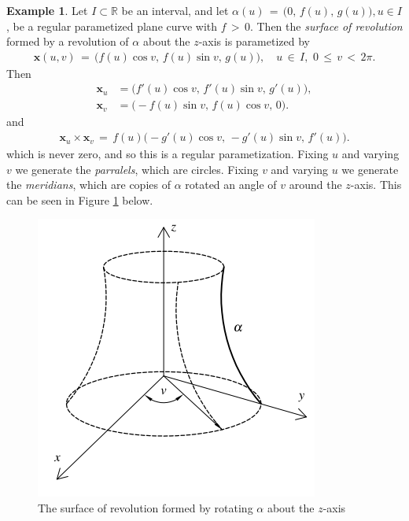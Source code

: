 \documentclass{UKZNcomp}
\newcommand{\vect}[1]{\mathbf{#1}} %
\theoremstyle{definition}
\newtheorem{example}[definition]{Example}
\theoremstyle{remark}
\begin{document}
\begin{example} \label{ex:233}
Let $I \subset \mathbb{R}$ be an interval, and let $\alpha(u) \, = \, \big(0, \,f(u),\,g(u)\big), u \in I$, be a regular parametized plane curve with $f \, > \, 0$. Then the \textit{surface of revolution} formed by a revolution of $\alpha$ about the $z$-axis is parametized by
\begin{align*}
\vect{x}(u,v) \, = \, \big(f(u)\cos v, \,f(u)\sin v, \, g(u)\big), \quad 	u\, \in \, I, \,\, 0\,\leq\,v\,<\,2\pi.
\end{align*}
Then
\begin{align*}
\vect x_u &= \big(f'(u)\cos v,\, f'(u)\sin v, \, g'(u)\big),\\
\vect x_v &= \big(-f(u)\sin v,\, f(u)\cos v, \,0\big).
\end{align*}
and
\begin{align*}
\vect x_u\times \vect x_v \, = \, f(u)\big(-g'(u)\cos v, \, -g'(u)\sin v,\, f'(u)\big).
\end{align*}
which is never zero, and so this is a regular parametization. Fixing $u$ and varying $v$ we generate the \textit{parralels}, which are circles. Fixing $v$ and varying $u$ we generate the \textit{meridians}, which are copies of $\alpha$ rotated an angle of $v$ around the $z$-axis. This can be seen in Figure \ref{fig:SurfaceRev} below.
\end{example}

\begin{figure}[H]
    \centerline{\includegraphics[scale=1]{SurfaceRev}}
    \caption[The Surface Of Revolution]{\label{fig:SurfaceRev}
    The surface of revolution formed by rotating $\alpha$ about the $z$-axis}
\end{figure}
\end{document}
